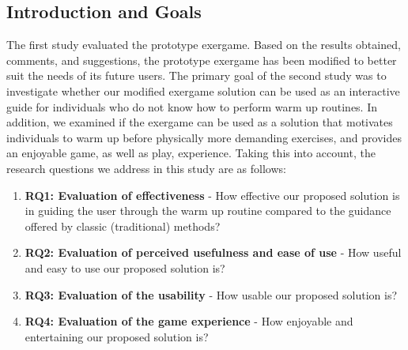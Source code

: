 \subsection{Introduction and Goals} \label{chapter:goals}
The first study evaluated the prototype exergame. Based on the results obtained, comments, and suggestions, the prototype exergame has been modified to better suit the needs of its future users. The primary goal of the second study was to investigate whether our modified exergame solution can be used as an interactive guide for individuals who do not know how to perform warm up routines. In addition, we examined if the exergame can be used as a solution that motivates individuals to warm up before physically more demanding exercises, and provides an enjoyable game, as well as play, experience. Taking this into account, the research questions we address in this study are as follows: 
\begin{enumerate}
\item \textbf{RQ1: Evaluation of effectiveness} - How effective our proposed solution is in guiding the user through the warm up routine compared to the guidance offered by classic (traditional) methods?
\item \textbf{RQ2: Evaluation of perceived usefulness and ease of use} - How useful and easy to use our proposed solution is?
\item \textbf{RQ3: Evaluation of the usability} - How usable our proposed solution is? 
\item \textbf{RQ4: Evaluation of the game experience} - How enjoyable and entertaining our proposed solution is? 
\end{enumerate}
